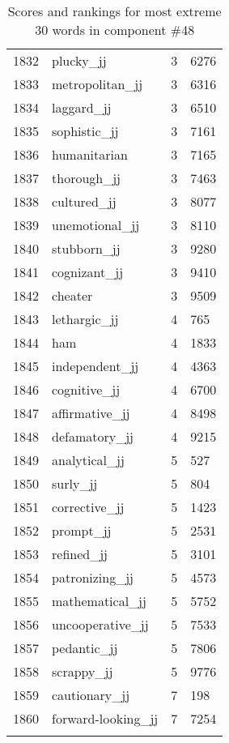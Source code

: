 \begin{longtable}[!htbp]{| rlr@{.}l |}
    1832 & plucky\_jj & 3 & 6276 \\
    1833 & metropolitan\_jj & 3 & 6316 \\
    1834 & laggard\_jj & 3 & 6510 \\
    1835 & sophistic\_jj & 3 & 7161 \\
    1836 & humanitarian & 3 & 7165 \\
    1837 & thorough\_jj & 3 & 7463 \\
    1838 & cultured\_jj & 3 & 8077 \\
    1839 & unemotional\_jj & 3 & 8110 \\
    1840 & stubborn\_jj & 3 & 9280 \\
    1841 & cognizant\_jj & 3 & 9410 \\
    1842 & cheater & 3 & 9509 \\
    1843 & lethargic\_jj & 4 & 765 \\
    1844 & ham & 4 & 1833 \\
    1845 & independent\_jj & 4 & 4363 \\
    1846 & cognitive\_jj & 4 & 6700 \\
    1847 & affirmative\_jj & 4 & 8498 \\
    1848 & defamatory\_jj & 4 & 9215 \\
    1849 & analytical\_jj & 5 & 527 \\
    1850 & surly\_jj & 5 & 804 \\
    1851 & corrective\_jj & 5 & 1423 \\
    1852 & prompt\_jj & 5 & 2531 \\
    1853 & refined\_jj & 5 & 3101 \\
    1854 & patronizing\_jj & 5 & 4573 \\
    1855 & mathematical\_jj & 5 & 5752 \\
    1856 & uncooperative\_jj & 5 & 7533 \\
    1857 & pedantic\_jj & 5 & 7806 \\
    1858 & scrappy\_jj & 5 & 9776 \\
    1859 & cautionary\_jj & 7 & 198 \\
    1860 & forward-looking\_jj & 7 & 7254 \\
    \hline
    \caption{Scores and rankings for most extreme 30 words in component \#48} \\
\end{longtable}
